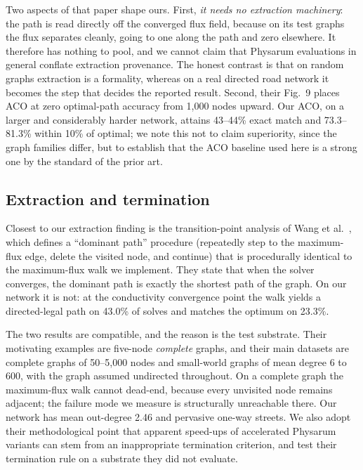 Two aspects of that paper shape ours. First, \emph{it needs no extraction
machinery}: the path is read directly off the converged flux field, because
on its test graphs the flux separates cleanly, going to one along the path
and zero elsewhere. It therefore has nothing to pool, and we cannot claim
that Physarum evaluations in general conflate extraction provenance. The
honest contrast is that on random graphs extraction is a formality, whereas
on a real directed road network it becomes the step that decides the reported
result. Second, their Fig.~9 places ACO at zero optimal-path accuracy from
1{,}000 nodes upward. Our ACO, on a larger and considerably harder network,
attains 43--44\% exact match and 73.3--81.3\% within 10\% of optimal; we
note this not to claim superiority, since the graph families differ, but to
establish that the ACO baseline used here is a strong one by the standard of
the prior art.

\subsection{Extraction and termination}

Closest to our extraction finding is the transition-point analysis of Wang et
al.~\cite{wang2021transition}, which defines a ``dominant path'' procedure (repeatedly step to the maximum-flux
edge, delete the visited node, and continue) that is procedurally identical to the maximum-flux walk we
implement. They state that when the solver converges, the dominant path is
exactly the shortest path of the graph. On our network it is not: at the
conductivity convergence point the walk yields a directed-legal path on
43.0\% of solves and matches the optimum on 23.3\%.

The two results are compatible, and the reason is the test substrate. Their
motivating examples are five-node \emph{complete} graphs, and their main
datasets are complete graphs of 50--5{,}000 nodes and small-world graphs of
mean degree 6 to 600, with the graph assumed undirected throughout. On a
complete graph the maximum-flux walk cannot dead-end, because every
unvisited node remains adjacent; the failure mode we measure is structurally
unreachable there. Our network has mean out-degree 2.46 and pervasive
one-way streets. We also adopt their methodological point that apparent speed-ups of
accelerated Physarum variants can stem from an inappropriate termination
criterion, and test their termination rule on a substrate they
did not evaluate.

